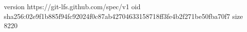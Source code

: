 version https://git-lfs.github.com/spec/v1
oid sha256:02e9f1b885f94fc92024f0c87ab42704633158718ff3fe4b2f271be50fba70f7
size 8220
